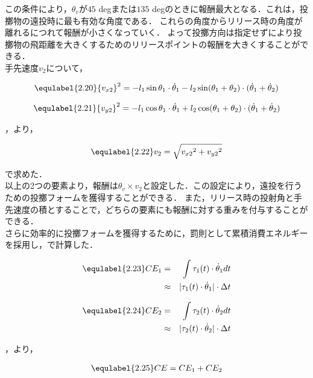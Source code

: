 この条件により，$\theta_{v}$が$45$ degまたは$135$ degのときに報酬最大となる．これは，投擲物の遠投時に最も有効な角度\cite{angle}である．
これらの角度からリリース時の角度が離れるにつれて報酬が小さくなっていく．
よって投擲方向は指定せずにより投擲物の飛距離を大きくするためのリリースポイントの報酬を大きくすることができる．\\
手先速度$v_{2}$について，

\begin{eqnarray}
  \equlabel{2.20}
  {v_{x2}}^2=-l_{1}\sin\theta_{1}\cdot\dot{\theta}_{1}-l_2\sin(\theta_{1}+\theta_{2})\cdot(\dot{\theta}_{1}+\dot{\theta}_{2})
\end{eqnarray}

\begin{eqnarray}
  \equlabel{2.21}
  {v_{y2}}^2=-l_{1}\cos\theta_{1}\cdot\dot{\theta}_{1}+l_2\cos(\theta_{1}+\theta_{2})\cdot(\dot{\theta}_{1}+\dot{\theta}_{2})
\end{eqnarray}

，より，

\begin{eqnarray}
  \equlabel{2.22}
  v_{2}=\sqrt{{v_{x2}}^2+{v_{y2}}^2}
\end{eqnarray}

で求めた．\\

以上の2つの要素より，報酬は$\theta_{v} \times v_{2}$と設定した．この設定により，遠投を行うための投擲フォームを獲得することができる．
また，リリース時の投射角と手先速度の積とすることで，どちらの要素にも報酬に対する重みを付与することができる．\\
さらに効率的に投擲フォームを獲得するために，罰則として累積消費エネルギーを採用し，で計算した．

\begin{eqnarray}
  \equlabel{2.23}
  CE_{1}&=&\int \tau_{1}(t)\cdot\dot{\theta}_{1} dt \nonumber \\
        &\approx&|\tau_{1}(t)\cdot\dot{\theta}_{1}|\cdot\Delta t
\end{eqnarray}

\begin{eqnarray}
  \equlabel{2.24}
  CE_{2}&=&\int \tau_{2}(t)\cdot\dot{\theta}_{2} dt \nonumber \\
        &\approx&|\tau_{2}(t)\cdot\dot{\theta}_{2}|\cdot\Delta t
\end{eqnarray}

，より，

\begin{eqnarray}
  \equlabel{2.25}
  CE = CE_{1} + CE_{2}
\end{eqnarray}


